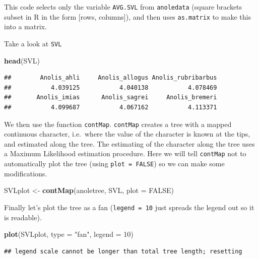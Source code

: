 \documentclass[]{book}
\newenvironment{Shaded}{\begin{snugshade}}{\end{snugshade}}
\newcommand{\KeywordTok}[1]{\textcolor[rgb]{0.13,0.29,0.53}{\textbf{{#1}}}}
\newcommand{\DataTypeTok}[1]{\textcolor[rgb]{0.13,0.29,0.53}{{#1}}}
\newcommand{\DecValTok}[1]{\textcolor[rgb]{0.00,0.00,0.81}{{#1}}}
\newcommand{\StringTok}[1]{\textcolor[rgb]{0.31,0.60,0.02}{{#1}}}
\newcommand{\OtherTok}[1]{\textcolor[rgb]{0.56,0.35,0.01}{{#1}}}
\newcommand{\NormalTok}[1]{{#1}}
\theoremstyle{definition}
\theoremstyle{definition}
\theoremstyle{definition}
\theoremstyle{remark}
\begin{document}
This code selects only the variable \texttt{AVG.SVL} from
\texttt{anoledata} (square brackets subset in R in the form {[}rows,
columns{]}), and then uses \texttt{as.matrix} to make this into a
matrix.

Take a look at \texttt{SVL}

\begin{Shaded}
\begin{Highlighting}[]
\KeywordTok{head}\NormalTok{(SVL)}
\end{Highlighting}
\end{Shaded}

\begin{verbatim}
##        Anolis_ahli     Anolis_allogus Anolis_rubribarbus 
##           4.039125           4.040138           4.078469 
##       Anolis_imias      Anolis_sagrei     Anolis_bremeri 
##           4.099687           4.067162           4.113371
\end{verbatim}

We then use the function \texttt{contMap}. \texttt{contMap} creates a
tree with a mapped continuous character, i.e.~where the value of the
character is known at the tips, and estimated along the tree. The
estimating of the character along the tree uses a Maximum Likelihood
estimation procedure. Here we will tell \texttt{contMap} not to
automatically plot the tree (using \texttt{plot\ =\ FALSE}) so we can
make some modifications.

\begin{Shaded}
\begin{Highlighting}[]
\NormalTok{SVLplot <-}\StringTok{ }\KeywordTok{contMap}\NormalTok{(anoletree, SVL, }\DataTypeTok{plot =} \OtherTok{FALSE}\NormalTok{)}
\end{Highlighting}
\end{Shaded}

Finally let's plot the tree as a fan (\texttt{legend\ =\ 10} just
spreads the legend out so it is readable).

\begin{Shaded}
\begin{Highlighting}[]
\KeywordTok{plot}\NormalTok{(SVLplot, }\DataTypeTok{type =} \StringTok{"fan"}\NormalTok{, }\DataTypeTok{legend =} \DecValTok{10}\NormalTok{)}
\end{Highlighting}
\end{Shaded}

\begin{verbatim}
## legend scale cannot be longer than total tree length; resetting
\end{verbatim}
\end{document}
